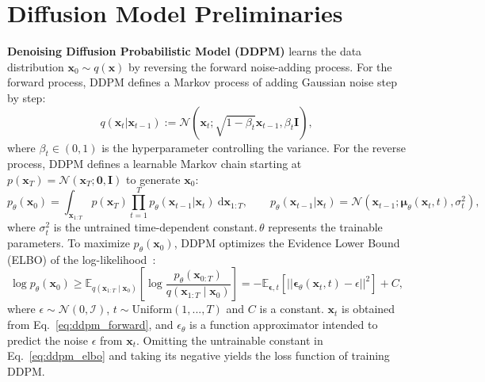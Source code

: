 \vspace{-2pt}
\section{Diffusion Model Preliminaries}
\vspace{-1pt}

\textbf{Denoising Diffusion Probabilistic Model (DDPM)} \cite{ho2020denoising} learns the data distribution 
$\mathbf{x}_0 \sim q(\mathbf{x}) $ 
by reversing the forward noise-adding process. 
For the forward process, DDPM defines a Markov process of adding Gaussian noise step by step:
\begin{equation}
    q(\mathbf{x}_t | \mathbf{x}_{t-1}) := \mathcal{N}(\mathbf{x}_t; \sqrt{1 - \beta_t} \mathbf{x}_{t-1}, \beta_t \mathbf{I}),
    \label{eq:ddpm_forward}
\end{equation}
where $\beta_{t} \in (0, 1)$ is the hyperparameter controlling the variance. 
For the reverse process, DDPM defines a learnable Markov chain starting at $p(\mathbf{x}_T)=\mathcal{N}(\mathbf{x}_T;\mathbf{0},\mathbf{I})$ to generate $\mathbf{x}_0$:
\begin{equation}\label{eq:reverse}
p_\theta(\mathbf{x}_{0}) =  \int_{\mathbf{x}_{1:T}} p(\mathbf{x}_T)\prod_{t=1}^T p_\theta(\mathbf{x}_{t-1}|\mathbf{x}_t)\  \mathrm{d}\mathbf{x}_{1:T}, 
\qquad 
    p_{\theta}(\mathbf{x}_{t-1} | \mathbf{x}_{t}) = \mathcal{N}(\mathbf{x}_{t-1}; \mathbf{\mu}_{\theta}(\mathbf{x}_{t}, t), \sigma_t^2),
\end{equation}
where $\sigma_t^2$ is the untrained time-dependent constant.\,$\theta$ represents the trainable parameters.
To maximize $p_\theta(\mathbf{x}_0)$, DDPM optimizes the Evidence Lower Bound (ELBO) of the log-likelihood~\cite{ho2020denoising, li2023your}:
\begin{equation}\label{eq:ddpm_elbo}
       \log p_\theta (\mathbf{x}_0 )  
       \geq \mathbb{E}_{q(\mathbf{x}_{1:T} \mid \mathbf{x}_0)}\left[\log \frac{p_\theta(\mathbf{x}_{0:T})}{q(\mathbf{x}_{1:T} \mid \mathbf{x}_0)}\right] 
   = - \mathbb{E}_{ \mathbf{\epsilon}, t} \left[|| \mathbf{\epsilon}_{\theta}( \mathbf{x}_t    , t) - \epsilon ||^2 \right] + C,
\end{equation}
where $\epsilon \sim \mathcal{N}(0,\mathcal{I})$,  $t \sim \text{Uniform}({1,...,T}) $ and $C$ is a constant. $\mathbf{x}_t$ 
is obtained from Eq.~\eqref{eq:ddpm_forward},
and $\epsilon_\theta$ is 
a function approximator intended to predict the noise $\epsilon$ from $\mathbf{x}_t$. Omitting the untrainable constant in Eq.~\eqref{eq:ddpm_elbo} and taking its negative yields the loss function of training DDPM.

